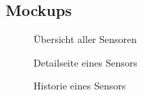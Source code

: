 \subsection{Mockups}
\label{app:Mockups}
\begin{figure}[htb]
\centering
{}
\caption{Übersicht aller Sensoren}
\end{figure}

\begin{figure}[htb]
\centering
{}
\caption{Detailseite eines Sensors}
\end{figure}

\begin{figure}[htb]
\centering
{}
\caption{Historie eines Sensors}
\end{figure}
